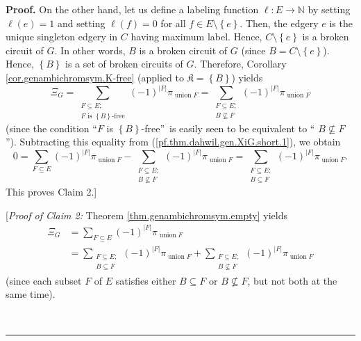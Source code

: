 \documentclass[numbers=enddot,12pt,final,onecolumn,notitlepage]{scrartcl}%
\theoremstyle{definition}
\newenvironment{proof}[1][Proof]{\noindent\textbf{#1.} }{\ \rule{0.5em}{0.5em}}
\newenvironment{verlong}{}{}
\newenvironment{vershort}{}{}
\let\sumnonlimits\sum
\renewcommand{\sum}{\sumnonlimits\limits}
\begin{document}
\begin{proof}
\begin{vershort}
On the other hand, let us define a labeling function $\ell:E\rightarrow
\mathbb{N}$ by setting $\ell\left(  e\right)  =1$ and setting $\ell\left(
f\right)  =0$ for all $f\in E\setminus\left\{  e\right\}  $. Then, the edgery
$e$ is the unique singleton edgery in $C$ having maximum label. Hence,
$C\setminus\left\{  e\right\}  $ is a broken circuit of $G$. In other words,
$B$ is a broken circuit of $G$ (since $B=C\setminus\left\{  e\right\}  $).
Hence, $\left\{  B\right\}  $ is a set of broken circuits of $G$. Therefore,
Corollary \ref{cor.genambichromsym.K-free} (applied to $\mathfrak{K}=\left\{
B\right\}  $) yields
\[
\Xi_{G}=\sum_{\substack{F\subseteq E;\\F\text{ is }\left\{  B\right\}
\text{-free}}}\left(  -1\right)  ^{\left\vert F\right\vert }\pi
_{\operatorname*{union}F}=\sum_{\substack{F\subseteq E;\\B\not \subseteq
F}}\left(  -1\right)  ^{\left\vert F\right\vert }\pi_{\operatorname*{union}F}%
\]
(since the condition \textquotedblleft$F$ is $\left\{  B\right\}
$-free\textquotedblright\ is easily seen to be equivalent to \textquotedblleft%
$B\not \subseteq F$\textquotedblright). Subtracting this equality from
(\ref{pf.thm.dahwil.gen.XiG.short.1}), we obtain%
\begin{equation}
0=\sum_{F\subseteq E}\left(  -1\right)  ^{\left\vert F\right\vert }%
\pi_{\operatorname*{union}F}-\sum_{\substack{F\subseteq E;\\B\not \subseteq
F}}\left(  -1\right)  ^{\left\vert F\right\vert }\pi_{\operatorname*{union}%
F}=\sum_{\substack{F\subseteq E;\\B\subseteq F}}\left(  -1\right)
^{\left\vert F\right\vert }\pi_{\operatorname*{union}F}.\nonumber
\end{equation}
This proves Claim 2.]
\end{vershort}

\begin{verlong}
[\textit{Proof of Claim 2:} Theorem \ref{thm.genambichromsym.empty} yields%
\begin{align}
\Xi_{G}  &  =\sum_{F\subseteq E}\left(  -1\right)  ^{\left\vert F\right\vert
}\pi_{\operatorname*{union}F}\nonumber\\
&  =\sum_{\substack{F\subseteq E;\\B\subseteq F}}\left(  -1\right)
^{\left\vert F\right\vert }\pi_{\operatorname*{union}F}+\sum
_{\substack{F\subseteq E;\\B\not \subseteq F}}\left(  -1\right)  ^{\left\vert
F\right\vert }\pi_{\operatorname*{union}F}
\label{pf.thm.dahwil.gen.XiG.c2.pf.2}%
\end{align}
(since each subset $F$ of $E$ satisfies either $B\subseteq F$ or
$B\not \subseteq F$, but not both at the same time).


\end{verlong}
\end{proof}
\end{document}
